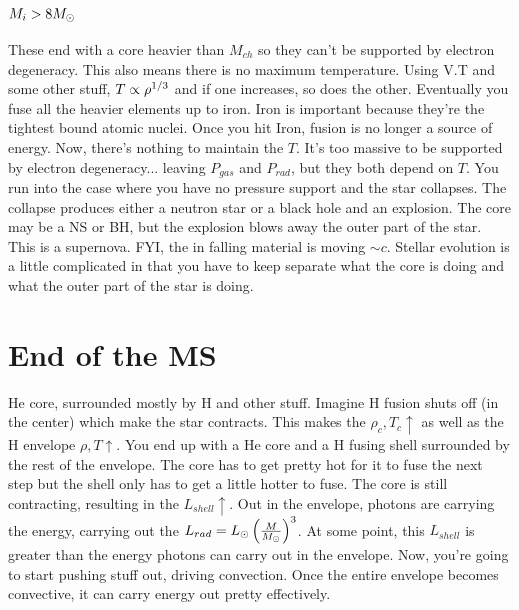 \subsection{$M_i > 8M_\odot$}

These end with a core heavier than $M_{ch}$ so they can't be supported by electron degeneracy. This also means there is no maximum temperature. Using V.T and some other stuff, $T \propto \rho^{1/3}$  and if one increases, so does the other. Eventually you fuse all the heavier elements up to iron. Iron is important because they're the tightest bound atomic nuclei. Once you hit Iron, fusion is no longer a source of energy. Now, there's nothing to maintain the $T$. It's too massive to be supported by electron degeneracy... leaving $P_{gas}$ and $P_{rad}$, but they both depend on $T$. You run into the case where you have no pressure support and the star collapses. The collapse produces either a neutron star or a black hole and an explosion. The core may be a NS or BH, but the explosion blows away the outer part of the star. This is a supernova. FYI, the in falling material is moving $\sim c$. Stellar evolution is a little complicated in that you have to keep separate what the core is doing and what the outer part of the star is doing. 

\section{End of the MS}

He core, surrounded mostly by H and other stuff. Imagine H fusion shuts off (in the center) which make the star contracts. This makes the $\rho_c,T_c \uparrow$ as well as the H envelope $\rho,T \uparrow$. You end up with a He core and a H fusing shell surrounded by the rest of the envelope. The core has to get pretty hot for it to fuse the next step but the shell only has to get a little hotter to fuse. The core is still contracting, resulting in the $L_{shell} \uparrow$. Out in the envelope, photons are carrying the energy, carrying out the $L_{rad} = L_\odot \left( \frac{M}{M_\odot}\right)^3$. At some point, this $L_{shell}$ is greater than the energy photons can carry out in the envelope. Now, you're going to start pushing stuff out, driving convection. Once the entire envelope becomes convective, it can carry energy out pretty effectively.\\

